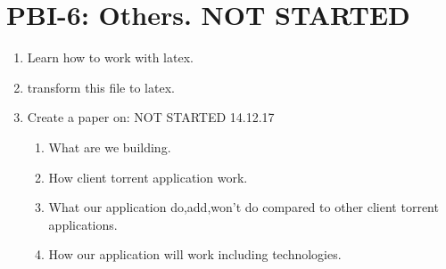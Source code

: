 \documentclass[11pt]{article}
\begin{document}
\section{PBI-6: Others. NOT STARTED}
\begin{enumerate}
\item Learn how to work with latex.
\item transform this file to latex.
\item Create a paper on: \colorbox{gray!20}{NOT STARTED} 14.12.17
\begin{enumerate}
\item What are we building.
\item How client torrent application work.
\item What our application do,add,won't do compared to other client torrent applications.
\item How our application will work including technologies.
\end{enumerate}
\end{enumerate}
\end{document}
